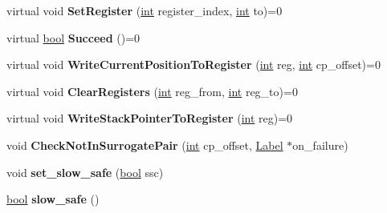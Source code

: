\begin{DoxyCompactItemize}
virtual void {\bfseries Set\+Register} (\mbox{\hyperlink{classint}{int}} register\+\_\+index, \mbox{\hyperlink{classint}{int}} to)=0
\item 
\mbox{\label{classv8_1_1internal_1_1RegExpMacroAssembler_a1e08e084eb2fa2e7ebe538631fcaaefb}} 
virtual \mbox{\hyperlink{classbool}{bool}} {\bfseries Succeed} ()=0
\item 
\mbox{\label{classv8_1_1internal_1_1RegExpMacroAssembler_ab2c114d6736c553fb03d898c05aa19ec}} 
virtual void {\bfseries Write\+Current\+Position\+To\+Register} (\mbox{\hyperlink{classint}{int}} reg, \mbox{\hyperlink{classint}{int}} cp\+\_\+offset)=0
\item 
\mbox{\label{classv8_1_1internal_1_1RegExpMacroAssembler_af27c82d6793671c4e55baa50655943e4}} 
virtual void {\bfseries Clear\+Registers} (\mbox{\hyperlink{classint}{int}} reg\+\_\+from, \mbox{\hyperlink{classint}{int}} reg\+\_\+to)=0
\item 
\mbox{\label{classv8_1_1internal_1_1RegExpMacroAssembler_ab20c01102f11c10c5077539e898bf063}} 
virtual void {\bfseries Write\+Stack\+Pointer\+To\+Register} (\mbox{\hyperlink{classint}{int}} reg)=0
\item 
\mbox{\label{classv8_1_1internal_1_1RegExpMacroAssembler_a213197a543acbc5e2aef5e4d2a11096b}} 
void {\bfseries Check\+Not\+In\+Surrogate\+Pair} (\mbox{\hyperlink{classint}{int}} cp\+\_\+offset, \mbox{\hyperlink{classv8_1_1internal_1_1Label}{Label}} $\ast$on\+\_\+failure)
\item 
\mbox{\label{classv8_1_1internal_1_1RegExpMacroAssembler_a5b98ff624af82e98e5fb7369aba4f334}} 
void {\bfseries set\+\_\+slow\+\_\+safe} (\mbox{\hyperlink{classbool}{bool}} ssc)
\item 
\mbox{\label{classv8_1_1internal_1_1RegExpMacroAssembler_a514e68e2f362575d6666a85cc4366e6e}} 
\mbox{\hyperlink{classbool}{bool}} {\bfseries slow\+\_\+safe} ()
\item 
\mbox{\label{classv8_1_1internal_1_1RegExpMacroAssembler_a4fa0c060dbcabb9dac145301a719c37f}} 

\end{DoxyCompactItemize}
